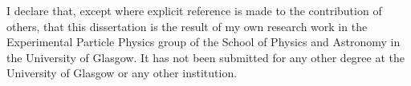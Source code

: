 
I declare that, except where explicit reference is made to the contribution of others, that this 
dissertation is the result of my own research work in the Experimental Particle Physics group of the
School of Physics and Astronomy in the University of Glasgow.
It has not been submitted for any other degree at the 
University of Glasgow or any other institution.

